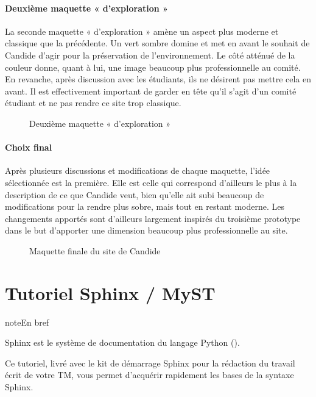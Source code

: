 \documentclass[a4,10pt,french]{sphinxmanual}
\begin{document}
\subsubsection{Deuxième maquette « d’exploration »}
\label{\detokenize{chapitre-06:deuxieme-maquette-dexploration}}
\sphinxAtStartPar
La seconde maquette « d’exploration » amène un aspect plus moderne et classique que la précédente. Un vert sombre domine et met en avant le souhait de Candide d’agir pour la préservation de l’environnement. Le côté atténué de la couleur donne, quant à lui, une image beaucoup plus professionnelle au comité.  En revanche, après discussion avec les étudiants, ils ne désirent pas mettre cela en avant. Il est effectivement important de garder en tête qu’il s’agit d’un comité étudiant et ne pas rendre ce site trop classique.

\begin{figure}[htbp]
\centering
\capstart

\noindent{}
\caption{Deuxième maquette « d’exploration »}\label{\detokenize{chapitre-06:id3}}\end{figure}


\subsubsection{Choix final}
\label{\detokenize{chapitre-06:choix-final}}
\sphinxAtStartPar
Après plusieurs discussions et modifications de chaque maquette, l’idée sélectionnée est la première. Elle est celle qui correspond d’ailleurs le plus à la description de ce que Candide veut, bien qu’elle ait subi beaucoup de modifications pour la rendre plus sobre, mais tout en restant moderne. Les changements apportés sont d’ailleurs largement inspirés du troisième prototype dans le but d’apporter une dimension beaucoup plus professionnelle au site.

\begin{figure}[htbp]
\centering
\capstart

\noindent{}
\caption{Maquette finale du site de Candide}\label{\detokenize{chapitre-06:id4}}\end{figure}


\chapter{Tutoriel Sphinx / MyST}
\label{\detokenize{tutoriel-sphinx/index:tutoriel-sphinx-myst}}\label{\detokenize{tutoriel-sphinx/index::doc}}
\begin{sphinxadmonition}{note}{En bref}

\sphinxAtStartPar
Sphinx est le système de documentation du langage Python ().

\sphinxAtStartPar
Ce tutoriel, livré avec le kit de démarrage Sphinx pour la rédaction du travail écrit de votre TM, vous permet d’acquérir rapidement les bases de la syntaxe Sphinx.
\end{sphinxadmonition}
\end{document}
